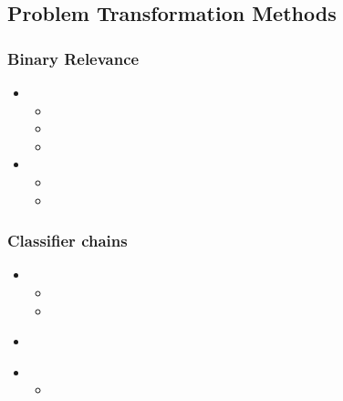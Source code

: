 \documentclass{beamer}
\begin{document}
\subsection{Problem Transformation Methods}

\begin{frame}
\frametitle{Binary Relevance}

\begin{itemize}
\item <2-> 
\begin{itemize}
\item <3-> 
\item <4-> 
\item <5-> 
\end{itemize}
\item <6-> 
\begin{itemize}
\item <7-> 
\item <8-> 
\end{itemize}
\end{itemize}
\end{frame}

\begin{frame}
\frametitle{Classifier chains}
\begin{itemize}
\item <2-> 
\begin{itemize}
\item 
\item <4-> 
\end{itemize}
\end{itemize}
\begin{itemize}
\item<5-> 
\end{itemize}

\begin{itemize}
\item <7-> 
\begin{itemize}
\item <8-> 
\end{itemize}
\end{itemize}
\end{frame}
\end{document}
